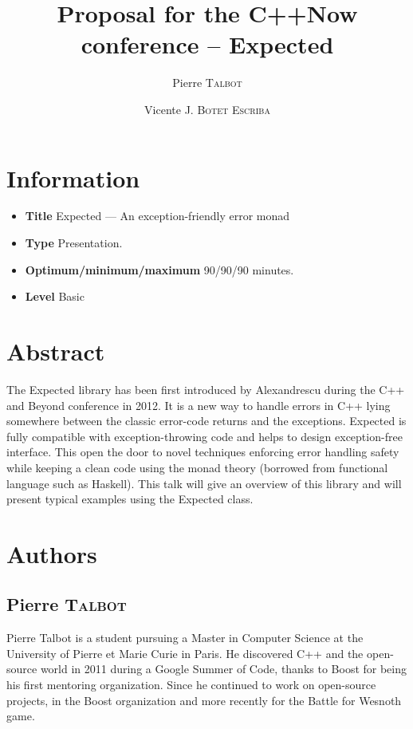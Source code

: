 \documentclass[a4paper,10pt]{article}
\title{Proposal for the C++Now conference – Expected}
\author{Pierre T\textsc{albot} \and Vicente J. B\textsc{otet} E\textsc{scriba}}
\begin{document}
\maketitle
\section{Information}

\begin{itemize}
\item \textbf{Title} Expected — An exception-friendly error monad
\item \textbf{Type} Presentation.
\item \textbf{Optimum/minimum/maximum} 90/90/90 minutes.
\item \textbf{Level} Basic
\end{itemize}

\section{Abstract}

The Expected library has been first introduced by Alexandrescu during the C++ and Beyond conference in 2012\cite{AlexandrescuExpected}. It is a new way to handle errors in C++ lying somewhere between the classic error-code returns and the exceptions. Expected is fully compatible with exception-throwing code and helps to design exception-free interface. This open the door to novel techniques enforcing error handling safety while keeping a clean code using the monad theory (borrowed from functional language such as Haskell). This talk will give an overview of this library and will present typical examples using the Expected class.

\section{Authors}

\subsection{Pierre T\textsc{albot}}

Pierre Talbot is a student pursuing a Master in Computer Science at the University of Pierre et Marie Curie in Paris. He discovered C++ and the open-source world in 2011 during a Google Summer of Code, thanks to Boost for being his first mentoring organization. Since he continued to work on open-source projects, in the Boost organization and more recently for the Battle for Wesnoth game.
\end{document}
